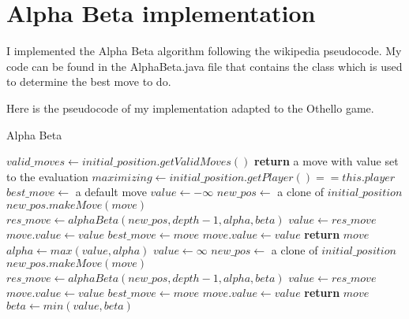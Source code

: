 \section{Alpha Beta implementation}

I implemented the Alpha Beta algorithm following the wikipedia pseudocode.
My code can be found in the AlphaBeta.java file that contains the class which is used to determine the best move to do.

Here is the pseudocode of my implementation adapted to the Othello game.

\FloatBarrier
\begin{algorithm}
    \caption{Alpha Beta}
    \begin{algorithmic}[1]
            \State $valid\_moves \gets initial\_position.getValidMoves()$
                \State \textbf{return} a move with value set to the evaluation
            \EndIf
            \State $maximizing \gets initial\_position.getPlayer() == this.player$
            \State $best\_move \gets$ a default move
                \State $value \gets -\infty$
                    \State $new\_pos \gets$ a clone of $initial\_position$    
                    \State $new\_pos.makeMove(move)$
                    \State $res\_move \gets alphaBeta(new\_pos, depth - 1, alpha, beta)$
                        \State $value \gets res\_move$
                        \State $move.value \gets value$
                        \State $best\_move \gets move$
                    \EndIf
                        \State $move.value \gets value$
                        \State \textbf{return} $move$
                    \EndIf
                    \State $alpha \gets max(value, alpha)$
                \EndFor
            \Else
                \State $value \gets \infty$
                    \State $new\_pos \gets$ a clone of $initial\_position$    
                    \State $new\_pos.makeMove(move)$
                    \State $res\_move \gets alphaBeta(new\_pos, depth - 1, alpha, beta)$
                        \State $value \gets res\_move$
                        \State $move.value \gets value$
                        \State $best\_move \gets move$
                    \EndIf
                        \State $move.value \gets value$
                        \State \textbf{return} $move$
                    \EndIf
                    \State $beta \gets min(value, beta)$
                \EndFor
            \EndIf
        \EndProcedure
    \end{algorithmic}
\end{algorithm}
\FloatBarrier

